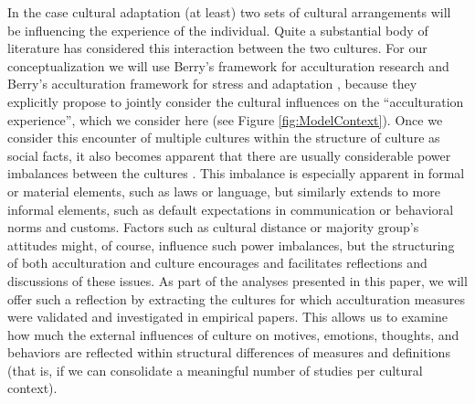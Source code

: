 \documentclass[man, 12pt, a4paper]{apa7}
\begin{document}
In the case cultural adaptation (at least) two sets of cultural arrangements will be influencing the experience of the individual. Quite a substantial body of literature has considered this interaction between the two cultures. For our conceptualization we will use Berry's framework for acculturation research \citep[e.g., see][p. 15, Fig. 2]{Berry1997b} and Berry's acculturation framework for stress and adaptation \citep[e.g., see][p. 45, Fig. 4.1]{Berry2006a}, because they explicitly propose to jointly consider the cultural influences on the ``acculturation experience'', which we consider here (see Figure \ref{fig:ModelContext}). Once we consider this encounter of multiple cultures within the structure of culture as social facts, it also becomes apparent that there are usually considerable power imbalances between the cultures \citep[e.g., see][]{Bhatia2001}. This imbalance is especially apparent in formal or material elements, such as laws or language, but similarly extends to more informal elements, such as default expectations in communication or behavioral norms and customs. Factors such as cultural distance \citep{Triandis2001} or majority group's attitudes \citep[e.g.,][]{Berry1997b, Berry2003} might, of course, influence such power imbalances, but the structuring of both acculturation and culture encourages and facilitates reflections and discussions of these issues. As part of the analyses presented in this paper, we will offer such a reflection by extracting the cultures for which acculturation measures were validated and investigated in empirical papers. This allows us to examine how much the external influences of culture on motives, emotions, thoughts, and behaviors are reflected within structural differences of measures and definitions (that is, if we can consolidate a meaningful number of studies per cultural context).
\end{document}
